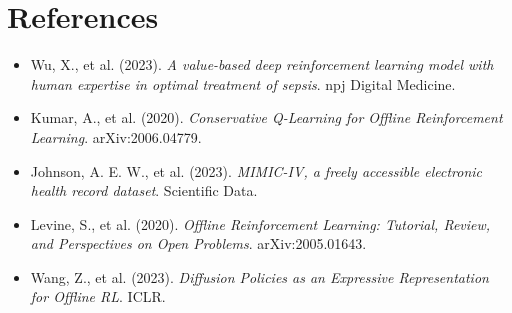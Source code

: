 \documentclass[11pt]{article}
\begin{document}
\section*{References}
\begin{itemize}[itemsep=10pt, parsep=2pt, topsep=4pt]
    \item Wu, X., et al. (2023). \textit{A value-based deep reinforcement learning model with human expertise in optimal treatment of sepsis}. npj Digital Medicine.
    \item Kumar, A., et al. (2020). \textit{Conservative Q-Learning for Offline Reinforcement Learning}. arXiv:2006.04779.
    \item Johnson, A. E. W., et al. (2023). \textit{MIMIC-IV, a freely accessible electronic health record dataset}. Scientific Data.
    \item Levine, S., et al. (2020). \textit{Offline Reinforcement Learning: Tutorial, Review, and Perspectives on Open Problems}. arXiv:2005.01643.
    \item Wang, Z., et al. (2023). \textit{Diffusion Policies as an Expressive Representation for Offline RL}. ICLR.
\end{itemize}
\end{document}
